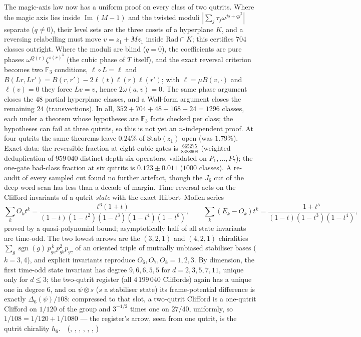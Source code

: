 The magic-axis law now has a uniform proof on every class of two qutrits. Where the magic axis lies inside $\operatorname{Im}(M-1)$
and the twisted moduli $|\sum_j\tau_j\omega^{js+qj^2}|$ separate ($q\neq0$), their level sets are the three cosets of a hyperplane $K$,
and a reversing relabelling must move $v=z_1+Mz_1$ inside $\mathrm{Rad}\cap K$; this certifies $704$ classes outright. Where the
moduli are blind ($q=0$), the coefficients are pure phases $\omega^{Q(r)}\zeta^{s(r)^3}$ (the cubic phase of $T$ itself), and
the exact reversal criterion becomes two $\mathbb F_3$ conditions, $\ell\circ L=\ell$ and $B(Lr,Lr')=B(r,r')-2\ell(t)\ell(r)\ell(r')$;
with $\ell=\mu B(v,\cdot)$ and $\ell(v)=0$ they force $Lv=v$, hence $2\omega(a,v)=0$. The same phase argument closes the $48$
partial hyperplane classes, and a Wall-form argument closes the remaining $24$ (transvections). In all, $352+704+48+168+24=1296$
classes, each under a theorem whose hypotheses are $\mathbb F_3$ facts checked per class; the hypotheses can fail at three qutrits,
so this is not yet an $n$-independent proof. At four qutrits the same theorems leave $0.24\%$ of $\mathrm{Stab}(z_1)$ open (was
$1.79\%$). Exact data: the reversible fraction at eight cubic gates is $\tfrac{665275}{8388608}$ (weighted deduplication of $959\,040$ distinct
depth-six operators, validated on $P_1,\dots,P_7$); the one-gate bad-class fraction at six qutrits is $0.123\pm 0.011$ ($1000$
classes). A re-audit of every sampled cut found no further artefact, though the $J_6$ cut of the deep-word scan has less than a
decade of margin. Time reversal acts on the Clifford invariants of a qutrit \emph{state} with the exact Hilbert--Molien series
\[ \sum_k O_k t^k=\frac{t^6(1+t)}{(1-t)(1-t^2)(1-t^3)(1-t^4)(1-t^6)},\qquad \sum_k (E_k-O_k)t^k=\frac{1+t^5}{(1-t)(1-t^3)(1-t^4)}, \]
proved by a quasi-polynomial bound; asymptotically half of all state invariants are time-odd. The two lowest arrows are the
$(3,2,1)$ and $(4,2,1)$ chiralities $\sum_g\operatorname{sgn}(g)\,p_{ga}^{\,k}p_{gb}^2p_{gc}$ of an oriented triple of mutually unbiased
stabiliser bases ($k=3,4$), and explicit invariants reproduce $O_6,O_7,O_8=1,2,3$. By dimension, the first time-odd state
invariant has degree $9,6,6,5,5$ for $d=2,3,5,7,11$, unique only for $d\le3$; the two-qutrit register (all $4\,199\,040$
Cliffords) again has a unique one in degree $6$, and on $\psi\otimes s$ ($s$ a stabiliser state) its frame-potential difference
is exactly $\Delta_6(\psi)/108$: compressed to that slot, a two-qutrit Clifford is a one-qutrit Clifford on $1/120$ of the
group and $3^{-1/2}$ times one on $27/40$, uniformly, so $1/108=1/120+1/1080$ --- the register's arrow, seen from one qutrit, is
the qutrit chirality $h_6$.
\tierT\,\tierC\ (, ,
, , ,
, )


